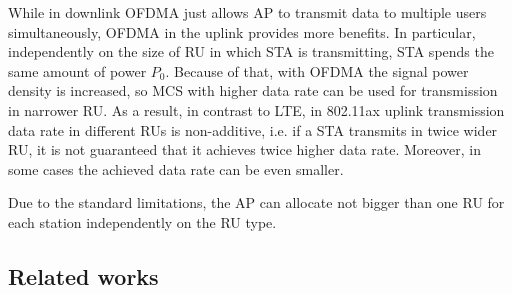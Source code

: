 \documentclass[conference]{IEEEtran}
\begin{document}
While in downlink OFDMA just allows AP to transmit data to multiple users simultaneously, OFDMA in the uplink provides more benefits. In particular, independently on the size of RU in which STA is transmitting, STA spends the same amount of power $P_0$. Because of that, with OFDMA the signal power density is increased, so MCS with higher data rate can be used for transmission in narrower RU. As a result, in contrast to LTE, in 802.11ax uplink transmission data rate in different RUs is non-additive, i.e. if a STA transmits in twice wider RU, it is not guaranteed that it achieves twice higher data rate. Moreover, in some cases the achieved data rate can be even smaller.

Due to the standard limitations, the AP can allocate not bigger than one RU for each station independently on the RU type.

%

\subsection{Related works}
\end{document}
